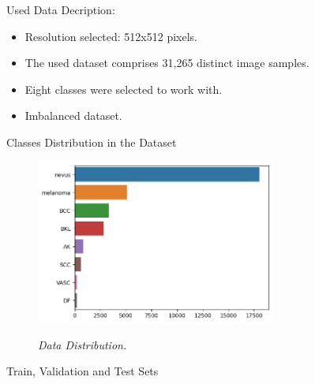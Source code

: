 \documentclass[dvipsnames,mathserif]{beamer}
\begin{document}
{\begin{frame}
    \end{frame}


    \begin{frame}

      \large Used Data Decription:
      \vspace{0.25cm}

      \footnotesize

      \begin{itemize}
        \item Resolution selected: 512x512 pixels.
        \item The used dataset comprises 31,265 distinct image samples.
        \item Eight classes were selected to work with.
        \item Imbalanced dataset.
      \end{itemize}

    \end{frame}

    \begin{frame}

      \large Classes Distribution in the Dataset
          \vspace{0.25cm}

      \begin{figure}[H]
        \centering
        \includegraphics[width=0.7\textwidth]{images/hole-dataset-diagnosis.png}
        \caption[Data Distribution]{\textit{Data Distribution. }}
        {\label{fig:hole-dataset-distribution}}
      \end{figure}

    \end{frame}

    \begin{frame}

      \large  Train, Validation and Test Sets
      \vspace{0.25cm}


\end{frame}}
\end{document}
